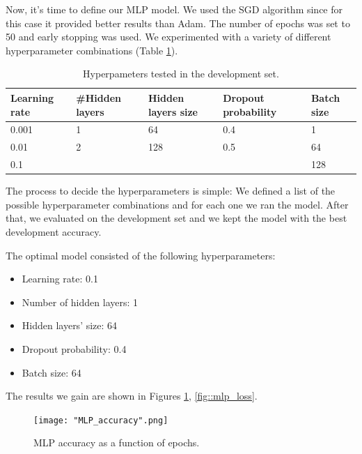 \documentclass[10pt, a4paper]{article}
\begin{document}
	Now, it’s time to define our MLP model. We used the SGD algorithm since for this case it provided better results than Adam. The number of epochs was set to 50 and early stopping was used. We experimented with a variety of different hyperparameter combinations (Table \ref{tab::ex-9-hyper}).
	
	
	
	
	\begin{table}
		\centering
		\begin{tabular}{|l|l|l|l|l|}
			\hline
			\rowcolor{blue!25}\textbf{Learning rate} & \cellcolor{blue!25}\textbf{\#Hidden layers} & \cellcolor{blue!25}\textbf{Hidden layers size} & \cellcolor{blue!25}\textbf{Dropout probability} & \cellcolor{blue!25}\textbf{Batch size}\\
			\hline
			0.001 & 1 & 64 & 0.4 & 1\\
			\hline
			0.01 & 2 & 128 & 0.5 & 64\\
			\hline
			0.1 &  &  & & 128 \\
			
			
			
			\hline
		\end{tabular}
		\caption{Hyperpameters tested in the development set.}
		\label{tab::ex-9-hyper}
	\end{table}
	
	The process to decide the hyperparameters is simple: We defined a list of the possible hyperparameter combinations and for each one we ran the model. After that, we evaluated on the development set and we kept the model with the best development accuracy.
	
	
	The optimal model consisted of the following hyperparameters:
	\begin{itemize}
		\item Learning rate: 0.1
		\item Number of hidden layers: 1
		\item Hidden layers' size: 64
		\item Dropout probability: 0.4
		\item Batch size: 64
	\end{itemize}
	
	The results we gain are shown in Figures \ref{fig::mlp_accuracy}, \ref{fig::mlp_loss}.
	
	\begin{figure}
		\centering
		\texttt{[image: "MLP\_accuracy".png]}
		\caption{MLP accuracy as a function of epochs.}
		\label{fig::mlp_accuracy}
	\end{figure}
	
\end{document}
